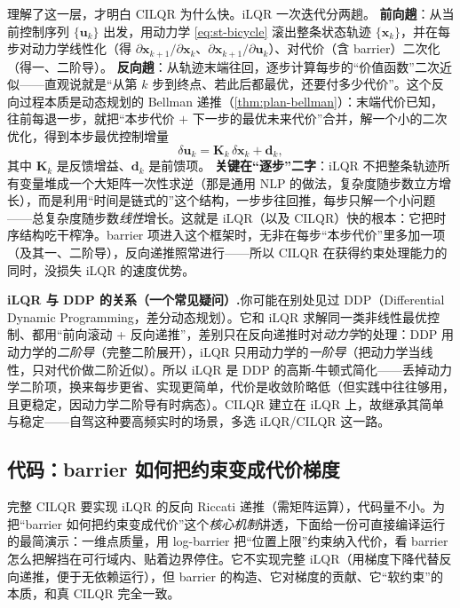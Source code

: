 \begin{derivation}\label{der:st-ilqr}
理解了这一层，才明白 CILQR 为什么快。iLQR 一次迭代分两趟。
\textbf{前向趟}：从当前控制序列 $\{\mathbf u_k\}$ 出发，用动力学 \cref{eq:st-bicycle} 滚出整条状态轨迹 $\{\mathbf x_k\}$，并在每步对动力学线性化（得 $\partial\mathbf x_{k+1}/\partial\mathbf x_k$、$\partial\mathbf x_{k+1}/\partial\mathbf u_k$）、对代价（含 barrier）二次化（得一、二阶导）。
\textbf{反向趟}：从轨迹末端往回，逐步计算每步的“价值函数”二次近似——直观说就是“从第 $k$ 步到终点、若此后都最优，还要付多少代价”。这个反向过程本质是动态规划的 Bellman 递推（\cref{thm:plan-bellman}）：末端代价已知，往前每退一步，就把“本步代价 $+$ 下一步的最优未来代价”合并，解一个小的二次优化，得到本步最优控制增量
\begin{equation}
  \delta\mathbf u_k=\mathbf K_k\,\delta\mathbf x_k+\mathbf d_k,
  \label{eq:st-ilqr-gain}
\end{equation}
其中 $\mathbf K_k$ 是反馈增益、$\mathbf d_k$ 是前馈项。
\textbf{关键在“逐步”二字}：iLQR 不把整条轨迹所有变量堆成一个大矩阵一次性求逆（那是通用 NLP 的做法，复杂度随步数立方增长），而是利用“时间是链式的”这个结构，一步步往回推，每步只解一个小问题——总复杂度随步数\emph{线性}增长。这就是 iLQR（以及 CILQR）快的根本：它把时序结构吃干榨净。barrier 项进入这个框架时，无非在每步“本步代价”里多加一项（及其一、二阶导），反向递推照常进行——所以 CILQR 在获得约束处理能力的同时，没损失 iLQR 的速度优势。
\end{derivation}

\begin{note}
\textbf{iLQR 与 DDP 的关系（一个常见疑问）.}\;你可能在别处见过 DDP（Differential Dynamic Programming，差分动态规划）。它和 iLQR 求解同一类非线性最优控制、都用“前向滚动 + 反向递推”，差别只在反向递推时对\emph{动力学}的处理：DDP 用动力学的\emph{二阶导}（完整二阶展开），iLQR 只用动力学的\emph{一阶导}（把动力学当线性，只对代价做二阶近似）。所以 iLQR 是 DDP 的高斯-牛顿式简化——丢掉动力学二阶项，换来每步更省、实现更简单，代价是收敛阶略低（但实践中往往够用，且更稳定，因动力学二阶导有时病态）。CILQR 建立在 iLQR 上，故继承其简单与稳定——自驾这种要高频实时的场景，多选 iLQR/CILQR 这一路。
\end{note}

\subsection{代码：barrier 如何把约束变成代价梯度}
\label{sec:st-cilqr-code}

完整 CILQR 要实现 iLQR 的反向 Riccati 递推（需矩阵运算），代码量不小。为把“barrier 如何把约束变成代价”这个\emph{核心机制}讲透，下面给一份可直接编译运行的最简演示：一维点质量，用 log-barrier 把“位置上限”约束纳入代价，看 barrier 怎么把解挡在可行域内、贴着边界停住。它不实现完整 iLQR（用梯度下降代替反向递推，便于无依赖运行），但 barrier 的构造、它对梯度的贡献、它“软约束”的本质，和真 CILQR 完全一致。

